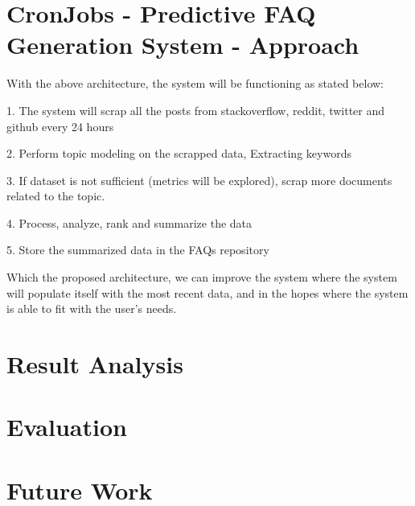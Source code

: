 \section{CronJobs - Predictive FAQ Generation System - Approach}
With the above architecture, the system will be functioning as stated below:

1. The system will scrap all the posts from stackoverflow, reddit, twitter and github every 24 hours

2. Perform topic modeling on the scrapped data, Extracting keywords

3. If dataset is not sufficient (metrics will be explored), scrap more documents related to the topic. 

4. Process, analyze, rank and summarize the data 

5. Store the summarized data in the FAQs repository

Which the proposed architecture, we can improve the system where the system will populate itself with the most recent data, and in the hopes where the system is able to fit with the user's needs.

\section{Result Analysis} 

\section{Evaluation} 

\section{Future Work} 